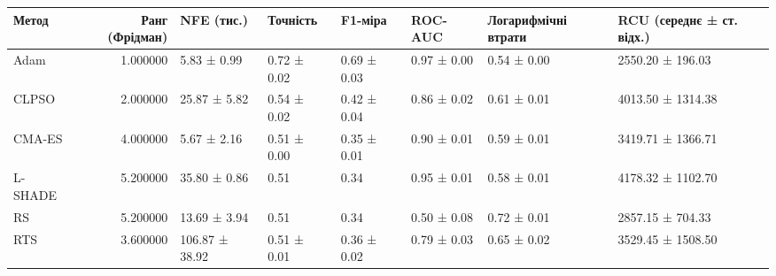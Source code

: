 \begin{tabular}{lrllllll}
\toprule
Метод & Ранг (Фрідман) & NFE (тис.) & Точність & F1-міра & ROC-AUC & Логарифмічні втрати & RCU (середнє ± ст. відх.) \\
\midrule
Adam & 1.000000 & 5.83 ± 0.99 & 0.72 ± 0.02 & 0.69 ± 0.03 & 0.97 ± 0.00 & 0.54 ± 0.00 & 2550.20 ± 196.03 \\
CLPSO & 2.000000 & 25.87 ± 5.82 & 0.54 ± 0.02 & 0.42 ± 0.04 & 0.86 ± 0.02 & 0.61 ± 0.01 & 4013.50 ± 1314.38 \\
CMA-ES & 4.000000 & 5.67 ± 2.16 & 0.51 ± 0.00 & 0.35 ± 0.01 & 0.90 ± 0.01 & 0.59 ± 0.01 & 3419.71 ± 1366.71 \\
L-SHADE & 5.200000 & 35.80 ± 0.86 & 0.51 & 0.34 & 0.95 ± 0.01 & 0.58 ± 0.01 & 4178.32 ± 1102.70 \\
RS & 5.200000 & 13.69 ± 3.94 & 0.51 & 0.34 & 0.50 ± 0.08 & 0.72 ± 0.01 & 2857.15 ± 704.33 \\
RTS & 3.600000 & 106.87 ± 38.92 & 0.51 ± 0.01 & 0.36 ± 0.02 & 0.79 ± 0.03 & 0.65 ± 0.02 & 3529.45 ± 1508.50 \\
\bottomrule
\end{tabular}

